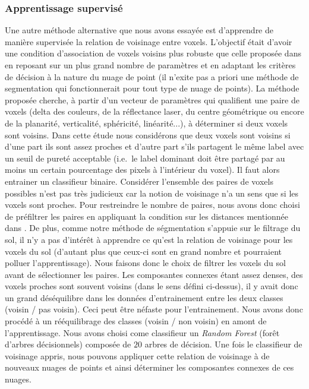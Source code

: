 \documentclass[a4paper, onecolumn, 11pt]{article}
\begin{document}
\subsubsection{Apprentissage supervisé}
Une autre méthode alternative que nous avons essayée est d'apprendre de manière supervisée la relation de voisinage entre voxels. L'objectif était d'avoir une condition d'association de voxels voisins plus robuste que celle proposée dans \cite{aka_article} en reposant sur un plus grand nombre de paramètres et en adaptant les critères de décision à la nature du nuage de point (il n'exite pas a priori une méthode de segmentation qui fonctionnerait pour tout type de nuage de points). La méthode proposée cherche, à partir d'un vecteur de paramètres qui qualifient une paire de voxels (delta des couleurs, de la réflectance laser, du centre géométrique ou encore de la planarité, verticalité, sphéricité, linéarité...), à déterminer si deux voxels sont voisins. Dans cette étude nous considérons que deux voxels sont voisins si d'une part ils sont assez proches et d'autre part s'ils partagent le même label avec un seuil de pureté acceptable (i.e.\ le label dominant doit être partagé par au moins un certain pourcentage des pixels à l'intérieur du voxel). Il faut alors entrainer un classifieur binaire. Considérer l'ensemble des paires de voxels possibles n'est pas très judicieux car la notion de voisinage n'a un sens que si les voxels sont proches. Pour restreindre le nombre de paires, nous avons donc choisi de préfiltrer les paires en appliquant la condition sur les distances mentionnée dans  \cite{aka_article}. De plus, comme notre méthode de ségmentation s'appuie sur le filtrage du sol, il n'y a pas d'intérêt à apprendre ce qu'est la relation de voisinage pour les voxels du sol (d'autant plus que ceux-ci sont en grand nombre et pourraient polluer l'apprentissage). Nous faisons donc le choix de filtrer les voxels du sol avant de sélectionner les paires. Les composantes connexes étant assez denses, des voxels proches sont souvent voisins (dans le sens défini ci-dessus), il y avait donc un grand déséquilibre dans les données d'entrainement entre les deux classes (voisin / pas voisin). Ceci peut être néfaste pour l'entrainement. Nous avons donc procédé à un rééquilibrage des classes (voisin / non voisin) en amont de l'apprentissage. Nous avons choisi come classifieur un \emph{Random Forest} (forêt d'arbres décisionnels) composée de $20$ arbres de décision. Une fois le classifieur de voisinage appris, nous pouvons appliquer cette relation de voisinage à de nouveaux nuages de points et ainsi déterminer les composantes connexes de ces nuages.
\end{document}
